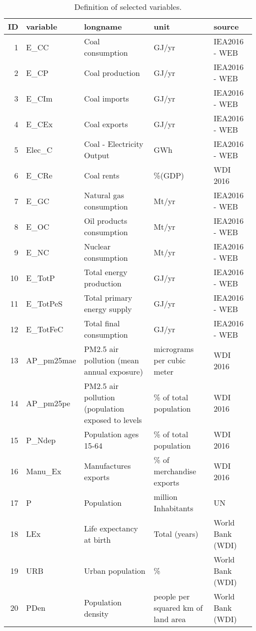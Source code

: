 \documentclass{article}\usepackage[]{graphicx}\usepackage[]{color}
\begin{document}
\begin{landscape}
\tiny

\begin{longtable}[t]{r|l|l|l|l}
\caption{\label{tab:vardef}Definition of selected variables.}\\
\hline
ID & variable & longname & unit & source\\
\hline
1 & E\_CC & Coal consumption & GJ/yr & IEA2016 - WEB\\
\hline
2 & E\_CP & Coal production & GJ/yr & IEA2016 - WEB\\
\hline
3 & E\_CIm & Coal imports & GJ/yr & IEA2016 - WEB\\
\hline
4 & E\_CEx & Coal exports & GJ/yr & IEA2016 - WEB\\
\hline
5 & Elec\_C & Coal - Electricity Output & GWh & IEA2016 - WEB\\
\hline
6 & E\_CRe & Coal rents & \%(GDP) & WDI 2016\\
\hline
7 & E\_GC & Natural gas consumption & Mt/yr & IEA2016 - WEB\\
\hline
8 & E\_OC & Oil products consumption & Mt/yr & IEA2016 - WEB\\
\hline
9 & E\_NC & Nuclear consumption & Mt/yr & IEA2016 - WEB\\
\hline
10 & E\_TotP & Total energy production & GJ/yr & IEA2016 - WEB\\
\hline
11 & E\_TotPeS & Total primary energy supply & GJ/yr & IEA2016 - WEB\\
\hline
12 & E\_TotFeC & Total final consumption & GJ/yr & IEA2016 - WEB\\
\hline
13 & AP\_pm25mae & PM2.5 air pollution (mean annual exposure) & micrograms per cubic meter & WDI 2016\\
\hline
14 & AP\_pm25pe & PM2.5 air pollution (population exposed to levels & \% of total population & WDI 2016\\
\hline
15 & P\_Ndep & Population ages 15-64 & \% of total population & WDI 2016\\
\hline
16 & Manu\_Ex & Manufactures exports & \% of merchandise exports & WDI 2016\\
\hline
17 & P & Population & million Inhabitants & UN\\
\hline
18 & LEx & Life expectancy at birth & Total (years) & World Bank (WDI)\\
\hline
19 & URB & Urban population & \% & World Bank (WDI)\\
\hline
20 & PDen & Population density & people per squared km of land area & World Bank (WDI)\\

\end{longtable}
\end{landscape}
\end{document}
